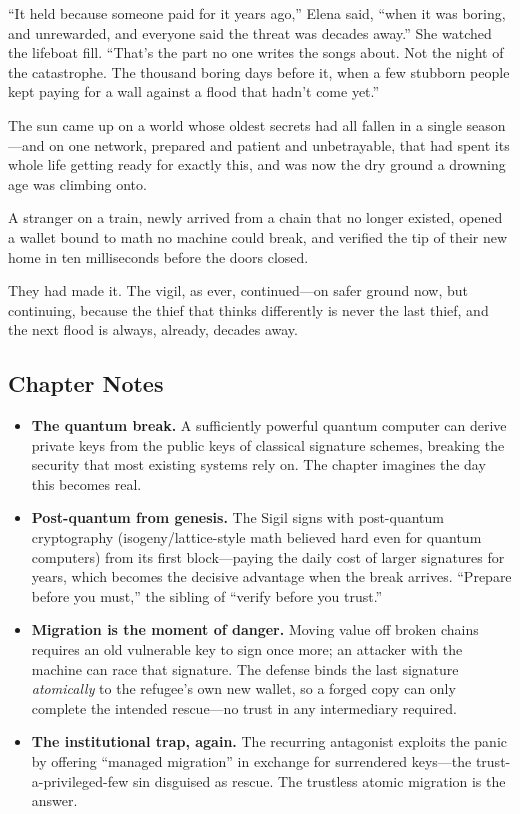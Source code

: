 ``It held because someone paid for it years ago,'' Elena said, ``when it was
boring, and unrewarded, and everyone said the threat was decades away.'' She
watched the lifeboat fill. ``That's the part no one writes the songs about. Not the
night of the catastrophe. The thousand boring days before it, when a few stubborn
people kept paying for a wall against a flood that hadn't come yet.''

The sun came up on a world whose oldest secrets had all fallen in a single season
---and on one network, prepared and patient and unbetrayable, that had spent its
whole life getting ready for exactly this, and was now the dry ground a drowning
age was climbing onto.

A stranger on a train, newly arrived from a chain that no longer existed, opened a
wallet bound to math no machine could break, and verified the tip of their new home
in ten milliseconds before the doors closed.

They had made it. The vigil, as ever, continued---on safer ground now, but
continuing, because the thief that thinks differently is never the last thief, and
the next flood is always, already, decades away.

\hypertarget{chapter-21-notes}{%
\subsection{Chapter Notes}\label{chapter-21-notes}}

\begin{itemize}
\tightlist
\item
  \textbf{The quantum break.} A sufficiently powerful quantum computer can derive
  private keys from the public keys of classical signature schemes, breaking the
  security that most existing systems rely on. The chapter imagines the day this
  becomes real.
\item
  \textbf{Post-quantum from genesis.} The Sigil signs with post-quantum
  cryptography (isogeny/lattice-style math believed hard even for quantum
  computers) from its first block---paying the daily cost of larger signatures for
  years, which becomes the decisive advantage when the break arrives. ``Prepare
  before you must,'' the sibling of ``verify before you trust.''
\item
  \textbf{Migration is the moment of danger.} Moving value off broken chains
  requires an old vulnerable key to sign once more; an attacker with the machine
  can race that signature. The defense binds the last signature \emph{atomically}
  to the refugee's own new wallet, so a forged copy can only complete the intended
  rescue---no trust in any intermediary required.
\item
  \textbf{The institutional trap, again.} The recurring antagonist exploits the
  panic by offering ``managed migration'' in exchange for surrendered keys---the
  trust-a-privileged-few sin disguised as rescue. The trustless atomic migration is
  the answer.
\end{itemize}
